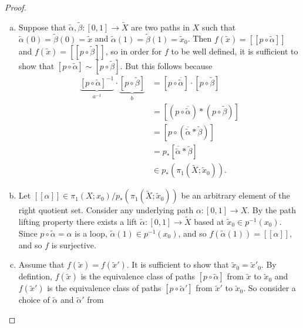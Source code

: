 \documentclass{article}
\begin{document}
\begin{proof} \text{} \\
  \begin{enumerate}[a.]
    \item Suppose that
    $\widetilde\alpha,\widetilde\beta\colon [0, 1]\rightarrow \widetilde X$
    are two paths in $X$ such that
    $\widetilde\alpha(0) = \widetilde\beta(0) = \widetilde x$ and
    $\widetilde\alpha(1) = \widetilde\beta(1) = \widetilde x_0$.
    Then $f(\widetilde x) = [[p \circ \widetilde \alpha]]$
    and $f(\widetilde x) = [[p \circ \widetilde \beta]]$, so in order for $f$
    to be well defined, it is sufficient to show that
    $[p \circ \widetilde \alpha] \sim [p \circ \widetilde \beta]$. But this
    follows because \begin{align*}
        \underbrace{[p \circ \widetilde \alpha]^{-1}}_{a^{-1}} \cdot
        \underbrace{[p \circ \widetilde \beta]}_{b}
        &= [p \circ \overline{\widetilde \alpha}] \cdot [p \circ \widetilde \beta] \\
        &= [(p \circ \overline{\widetilde \alpha}) * (p \circ \widetilde \beta)] \\
        &= [p \circ (\overline{\widetilde \alpha} * \widetilde \beta)] \\
        &= p_*[\overline{\widetilde \alpha} * \widetilde \beta] \\
        &\in p_*(\pi_1(\widetilde X; \widetilde x_0)).
    \end{align*}
    \item Let
    $[[\alpha]] \in \pi_1(X; x_0)/p_*(\pi_1(\widetilde X; \widetilde x_0))$ be
    an arbitrary element of the right quotient set. Consider any underlying
    path $\alpha\colon [0, 1] \rightarrow X$. By the path lifting property there
    exists a lift $\widetilde\alpha\colon [0, 1] \rightarrow \widetilde X$ based
    at $\widetilde x_0 \in p^{-1}(x_0)$. Since $p\circ\widetilde\alpha = \alpha$
    is a loop, $\widetilde\alpha(1) \in p^{-1}(x_0)$, and so
    $f(\widetilde\alpha(1)) = [[\alpha]]$, and so $f$ is surjective.
    \item Assume that $f(\widetilde x) = f(\widetilde x')$. It is sufficient
    to show that $\widetilde x_0 = \widetilde x'_0$. By defintion,
    $f(\widetilde x)$ is the equivalence class of paths
    $[p \circ \widetilde \alpha]$ from $\widetilde x$ to $\widetilde x_0$
    and $f(\widetilde x')$ is the equivalence class of paths
    $[p \circ \widetilde \alpha']$ from $\widetilde x'$ to $\widetilde x_0$.
    So consider a choice of $\widetilde \alpha$ and $\widetilde \alpha'$ from

\end{enumerate}
\end{proof}
\end{document}
